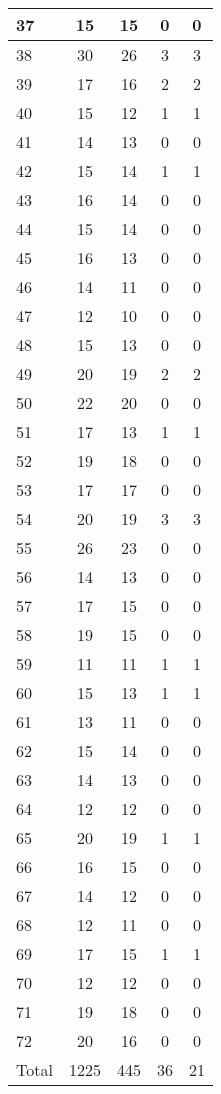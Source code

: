 \begin{center}
\begin{longtable}{l|c|c|c|c}
37 & 15 & 15 & 0 & 0\\ \hline
38 & 30 & 26 & 3 & 3\\ \hline
39 & 17 & 16 & 2 & 2\\ \hline
40 & 15 & 12 & 1 & 1\\ \hline
41 & 14 & 13 & 0 & 0\\ \hline
42 & 15 & 14 & 1 & 1\\ \hline
43 & 16 & 14 & 0 & 0\\ \hline
44 & 15 & 14 & 0 & 0\\ \hline
45 & 16 & 13 & 0 & 0\\ \hline
46 & 14 & 11 & 0 & 0\\ \hline
47 & 12 & 10 & 0 & 0\\ \hline
48 & 15 & 13 & 0 & 0\\ \hline
49 & 20 & 19 & 2 & 2\\ \hline
50 & 22 & 20 & 0 & 0\\ \hline
51 & 17 & 13 & 1 & 1\\ \hline
52 & 19 & 18 & 0 & 0\\ \hline
53 & 17 & 17 & 0 & 0\\ \hline
54 & 20 & 19 & 3 & 3\\ \hline
55 & 26 & 23 & 0 & 0\\ \hline
56 & 14 & 13 & 0 & 0\\ \hline
57 & 17 & 15 & 0 & 0\\ \hline
58 & 19 & 15 & 0 & 0\\ \hline
59 & 11 & 11 & 1 & 1\\ \hline
60 & 15 & 13 & 1 & 1\\ \hline
61 & 13 & 11 & 0 & 0\\ \hline
62 & 15 & 14 & 0 & 0\\ \hline
63 & 14 & 13 & 0 & 0\\ \hline
64 & 12 & 12 & 0 & 0\\ \hline
65 & 20 & 19 & 1 & 1\\ \hline
66 & 16 & 15 & 0 & 0\\ \hline
67 & 14 & 12 & 0 & 0\\ \hline
68 & 12 & 11 & 0 & 0\\ \hline
69 & 17 & 15 & 1 & 1\\ \hline
70 & 12 & 12 & 0 & 0\\ \hline
71 & 19 & 18 & 0 & 0\\ \hline
72 & 20 & 16 & 0 & 0\\ \hline
Total & 1225 & 445 & 36 & 21
\end{longtable}
\end{center}




